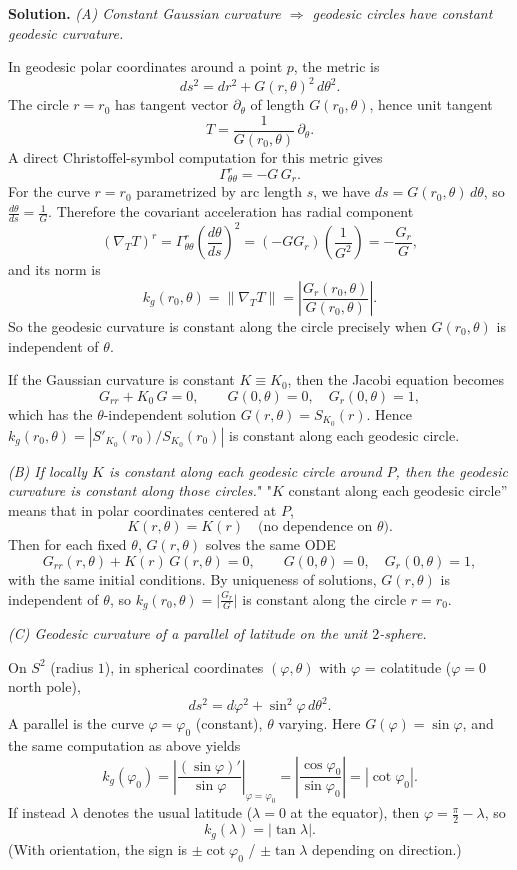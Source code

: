 \documentclass[12pt,a4paper]{article}
\theoremstyle{plain}
\theoremstyle{definition}      %
\begin{document}
\textbf{Solution.}
\emph{(A) Constant Gaussian curvature \(\Rightarrow\) geodesic circles have constant geodesic curvature.}

In geodesic polar coordinates around a point \(p\), the metric is
\[
ds^{2}=dr^{2}+G(r,\theta)^{2}\,d\theta^{2}.
\]
The circle \(r=r_{0}\) has tangent vector \(\partial_\theta\) of length \(G(r_0,\theta)\), hence unit tangent
\[
T=\frac{1}{G(r_0,\theta)}\,\partial_\theta.
\]
A direct Christoffel-symbol computation for this metric gives
\[
\Gamma^{r}_{\theta\theta}=-G\,G_{r}.
\]
For the curve \(r=r_0\) parametrized by arc length \(s\), we have \(ds = G(r_0,\theta)\,d\theta\), so \(\frac{d\theta}{ds}=\frac{1}{G}\). Therefore the covariant acceleration has radial component
\[
(\nabla_T T)^r=\Gamma^{r}_{\theta\theta}\left(\frac{d\theta}{ds}\right)^{2}
= (-G G_r)\left(\frac{1}{G^{2}}\right)= -\frac{G_r}{G},
\]
and its norm is
\[
k_g(r_0,\theta)=\left\lVert \nabla_T T\right\rVert=\left|\frac{G_r(r_0,\theta)}{G(r_0,\theta)}\right|.
\]
So the geodesic curvature is constant along the circle precisely when \(G(r_0,\theta)\) is independent of \(\theta\).

If the Gaussian curvature is constant \(K\equiv K_0\), then the Jacobi equation becomes
\[
G_{rr}+K_0\,G=0,\qquad G(0,\theta)=0,\quad G_r(0,\theta)=1,
\]
which has the \(\theta\)-independent solution \(G(r,\theta)=S_{K_0}(r)\). Hence \(k_g(r_0,\theta)=|S'_{K_0}(r_0)/S_{K_0}(r_0)|\) is constant along each geodesic circle.

\medskip
\emph{(B) If locally \(K\) is constant along each geodesic circle around \(P\), then the geodesic curvature is constant along those circles.}"
"\(K\) constant along each geodesic circle” means that in polar coordinates centered at \(P\),
\[
K(r,\theta)=K(r)\quad \text{(no dependence on }\theta\text{)}.
\]
Then for each fixed \(\theta\), \(G(r,\theta)\) solves the same ODE
\[
G_{rr}(r,\theta)+K(r)\,G(r,\theta)=0,\qquad G(0,\theta)=0,\quad G_r(0,\theta)=1,
\]
with the same initial conditions. By uniqueness of solutions, \(G(r,\theta)\) is independent of \(\theta\), so \(k_g(r_0,\theta)=\big|\frac{G_r}{G}\big|\) is constant along the circle \(r=r_0\).

\medskip
\emph{(C) Geodesic curvature of a parallel of latitude on the unit \(2\)-sphere.}

On \(S^{2}\) (radius \(1\)), in spherical coordinates \((\varphi,\theta)\) with \(\varphi\) = colatitude (\(\varphi=0\) north pole),
\[
ds^{2}=d\varphi^{2}+\sin^{2}\varphi\,d\theta^{2}.
\]
A parallel is the curve \(\varphi=\varphi_{0}\) (constant), \(\theta\) varying. Here \(G(\varphi)=\sin\varphi\), and the same computation as above yields
\[
k_g(\varphi_0)=\left|\frac{(\sin\varphi)' }{\sin\varphi}\right|_{\varphi=\varphi_0}
=\left|\frac{\cos\varphi_0}{\sin\varphi_0}\right|
=|\cot\varphi_0|.
\]
If instead \(\lambda\) denotes the usual latitude (\(\lambda=0\) at the equator), then \(\varphi=\frac{\pi}{2}-\lambda\), so
\[
k_g(\lambda)=|\tan\lambda|.
\]
(With orientation, the sign is \(\pm \cot\varphi_0\) / \(\pm\tan\lambda\) depending on direction.)
\end{document}
